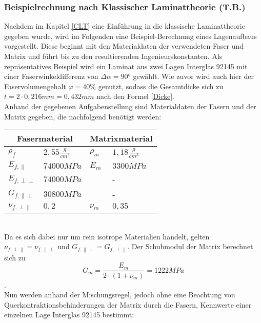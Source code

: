 \subsubsection{Beispielrechnung nach Klassischer Laminattheorie (T.B.)}
Nachdem im Kapitel \ref{CLT} eine Einführung in die klassische Laminattheorie gegeben wurde, wird im Folgenden eine Beispiel-Berechnung eines Lagenaufbaus vorgestellt. Diese beginnt mit den Materialdaten der verwendeten Faser und Matrix und führt bis zu den resultierenden Ingenieurskonstanten. Als repräsentatives Beispiel wird ein Laminat aus zwei Lagen Interglas 92145 mit einer Faserwinkeldifferenz von $\Delta\alpha =90°$ gewählt. Wie zuvor wird auch hier der Faservolumengehalt $\varphi = 40\%$ genutzt, sodass die Gesamtdicke sich zu $t= 2\cdot 0,216mm=0,432mm$ nach den Formel \ref{Dicke}. \\

\noindent Anhand der gegebenen Aufgabenstellung sind Materialdaten der Fasern und der Matrix gegeben, die nachfolgend benötigt werden:\\

\begin{tabular}{ll|ll}
	\multicolumn{2}{c}{Fasermaterial} &\multicolumn{2}{c}{Matrixmaterial}\\
	\hline
	$\rho_{f}$ & $2,55 \frac{g}{cm^{3}}$  & $\rho_{m}$ & $1,18 \frac{g}{cm^{3}}$\\
	\hline
	$E_{f,\parallel}$ & $74000MPa$  & $E_{m}$ & $3300MPa$\\
	\hline
	$E_{f,\perp\perp}$ & $74000MPa$  &  & - \\
	\hline
	$G_{f,\parallel\perp}$ & $30800MPa$ &  & - \\
	\hline
	$\nu_{f,\perp\parallel}$ & $0,2$  &$\nu_{m}$ &  $0,35$\\
\end{tabular}\\

\noindent Da es sich dabei nur um rein isotrope Materialien handelt, gelten $\nu_{f,\perp\parallel} = \nu_{f,\parallel\perp}$ und $G_{f,\parallel\perp} = G_{f,\perp\parallel}$. Der Schubmodul der Matrix berechnet sich zu
\begin{equation}
 	G_{m}=\frac{E_{m}}{2\cdot (1+\nu_{m})}=1222MPa
\end{equation}.\\

\noindent Nun werden anhand der Mischungsregel, jedoch ohne eine Beachtung von Querkontraktionsbehinderungen der Matrix durch die Fasern, Kennwerte einer einzelnen Lage Interglas 92145 bestimmt:

